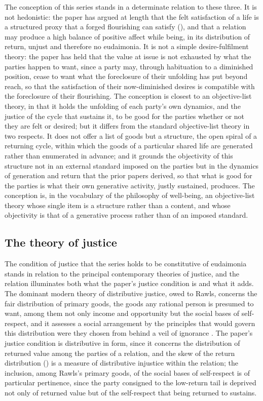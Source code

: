 The conception of this series stands in a determinate relation to these three. It is not hedonistic: the paper has argued at length that the felt satisfaction of a life is a structured proxy that a forged flourishing can satisfy (), and that a relation may produce a high balance of positive affect while being, in its distribution of return, unjust and therefore no eudaimonia. It is not a simple desire-fulfilment theory: the paper has held that the value at issue is not exhausted by what the parties happen to want, since a party may, through habituation to a diminished position, cease to want what the foreclosure of their unfolding has put beyond reach, so that the satisfaction of their now-diminished desires is compatible with the foreclosure of their flourishing. The conception is closest to an objective-list theory, in that it holds the unfolding of each party's own dynamics, and the justice of the cycle that sustains it, to be good for the parties whether or not they are felt or desired; but it differs from the standard objective-list theory in two respects. It does not offer a list of goods but a structure, the open spiral of a returning cycle, within which the goods of a particular shared life are generated rather than enumerated in advance; and it grounds the objectivity of this structure not in an external standard imposed on the parties but in the dynamics of generation and return that the prior papers derived, so that what is good for the parties is what their own generative activity, justly sustained, produces. The conception is, in the vocabulary of the philosophy of well-being, an objective-list theory whose single item is a structure rather than a content, and whose objectivity is that of a generative process rather than of an imposed standard.

\subsection{The theory of justice}
\label{p11:sec:phil-justice}

The condition of justice that the series holds to be constitutive of eudaimonia stands in relation to the principal contemporary theories of justice, and the relation illuminates both what the paper's justice condition is and what it adds. The dominant modern theory of distributive justice, owed to Rawls, concerns the fair distribution of primary goods, the goods any rational person is presumed to want, among them not only income and opportunity but the social bases of self-respect, and it assesses a social arrangement by the principles that would govern this distribution were they chosen from behind a veil of ignorance \parencite{rawls1971}. The paper's justice condition is distributive in form, since it concerns the distribution of returned value among the parties of a relation, and the skew of the return distribution () is a measure of distributive injustice within the relation; the inclusion, among Rawls's primary goods, of the social bases of self-respect is of particular pertinence, since the party consigned to the low-return tail is deprived not only of returned value but of the self-respect that being returned to sustains.

